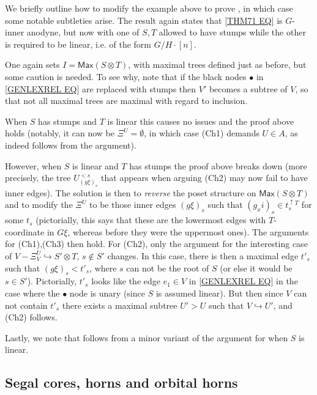 \documentclass[a4paper,10pt
,draft
]{article}%
\begin{document}
 
\begin{remark}
We briefly outline how to modify the example above to prove 
\cite[Thm 7.1(ii)]{Per17}, in which case some notable subtleties arise.
The result again states that \eqref{THM71 EQ} is $G$-inner anodyne, but now with one of $S,T$ allowed to have stumps while the other is required to be linear, i.e. of the form $G/H \cdot [n]$.

One again sets $I=\mathsf{Max}(S\otimes T)$, with maximal trees defined just as before, but some caution is needed.
To see why, note that if the black nodes $\bullet$ in \eqref{GENLEXREL EQ} are replaced with stumps then $V'$
becomes a subtree of $V$, so that not all maximal trees are maximal with regard to inclusion.

When $S$ has stumps and $T$ is linear this causes no issues and the proof above holds
(notably, it can now be 
$\Xi^U=\emptyset$, in which case (Ch1) demands $U \in A$,
as indeed follows from the argument).

However, when $S$ is linear and $T$ has stumps the proof above breaks down (more precisely, the tree $U_{(g\xi)_s}^{<s}$ that appears when arguing (Ch2) may now fail to have inner edges). The solution is then to \textit{reverse} the poset structure on 
$\mathsf{Max}(S\otimes T)$
and to modify the $\Xi^U$ to be those inner edges $(g \xi)_s$ such that
$(g _xi)_s \in t_s^{\uparrow T}$ for some $t_s$
(pictorially, this says that these are the lowermost edges with $T$-coordinate in $G\xi$, whereas before they were the uppermost ones). The arguments for (Ch1),(Ch3) then hold.
For (Ch2), only the argument for the interesting case of
$V- \Xi_V^U \hookrightarrow S' \otimes T$, $s \not \in S'$
changes. In this case, there is then a maximal edge $t'_s$ such that $(g \xi)_s < t'_s$, where $s$ can not be the root of $S$ (or else it would be $s \in S'$). Pictorially, $t'_s$ looks like the edge $e_1 \in V$ in \eqref{GENLEXREL EQ} in the case where the $\bullet$ node is unary (since $S$ is assumed linear). But then since $V$ can not contain $t'_s$ there exists a maximal subtree $U' > U$ such that $V \hookrightarrow U'$,
and (Ch2) follows.

Lastly, we note that \cite[Thm. 7.2]{Per17} follows from a minor variant of the argument for \cite[Thm. 7.1(ii)]{Per17} when $S$ is linear.
\end{remark}



\subsection{Segal cores, horns and orbital horns}\label{HYPERSAT SEC}
\end{document}
